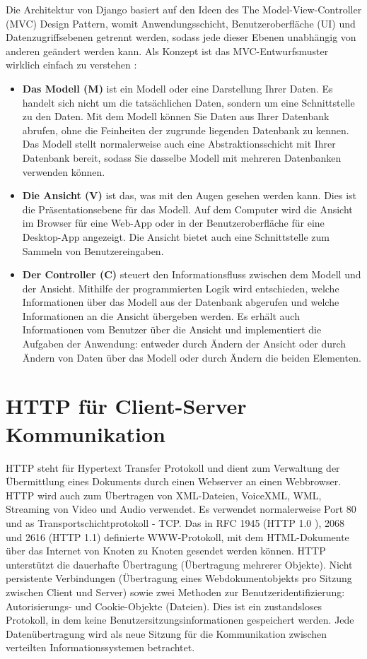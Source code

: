 Die Architektur von Django basiert auf den Ideen des The Model-View-Controller (MVC) Design Pattern, womit Anwendungsschicht, Benutzeroberfläche (UI) und Datenzugriffsebenen getrennt werden, sodass jede dieser Ebenen unabhängig von anderen geändert werden kann. Als Konzept ist das MVC-Entwurfsmuster wirklich einfach zu verstehen \cite[pp. 15-16]{george:django}:
\begin{itemize}
	\item \textbf{Das Modell (M)} ist ein Modell oder eine Darstellung Ihrer Daten. Es handelt sich nicht um die tatsächlichen Daten, sondern um eine Schnittstelle zu den Daten. Mit dem Modell können Sie Daten aus Ihrer Datenbank abrufen, ohne die Feinheiten der zugrunde liegenden Datenbank zu kennen. Das Modell stellt normalerweise auch eine Abstraktionsschicht mit Ihrer Datenbank bereit, sodass Sie dasselbe Modell mit mehreren Datenbanken verwenden können.
	\item \textbf{Die Ansicht (V)} ist das, was mit den Augen gesehen werden kann. Dies ist die Präsentationsebene für das Modell. Auf dem Computer wird die Ansicht im Browser für eine Web-App oder in der Benutzeroberfläche für eine Desktop-App angezeigt. Die Ansicht bietet auch eine Schnittstelle zum Sammeln von Benutzereingaben.
	\item \textbf{Der Controller (C)} steuert den Informationsfluss zwischen dem Modell und der Ansicht. Mithilfe der programmierten Logik wird entschieden, welche Informationen über das Modell aus der Datenbank abgerufen und welche Informationen an die Ansicht übergeben werden. Es erhält auch Informationen vom Benutzer über die Ansicht und implementiert die Aufgaben der Anwendung: entweder durch Ändern der Ansicht oder durch Ändern von Daten über das Modell oder durch Ändern die beiden Elementen.
\end{itemize}

\section{HTTP für Client-Server Kommunikation}
\label{sec:theorie:http}
HTTP steht für Hypertext Transfer Protokoll und dient zum Verwaltung der Übermittlung eines Dokuments durch einen Webserver an einen Webbrowser. HTTP wird auch zum Übertragen von XML-Dateien, VoiceXML, WML, Streaming von Video und Audio verwendet. Es verwendet normalerweise Port 80 und as Transportschichtprotokoll - TCP. Das in RFC 1945 (HTTP 1.0 \cite{website:httprfc1945}), 2068 \cite{website:httprfc2068} und 2616 (HTTP 1.1) definierte WWW-Protokoll, mit dem HTML-Dokumente über das Internet von Knoten zu Knoten gesendet werden können. HTTP unterstützt die dauerhafte Übertragung (Übertragung mehrerer Objekte). Nicht persistente Verbindungen (Übertragung eines Webdokumentobjekts pro Sitzung zwischen Client und Server) sowie zwei Methoden zur Benutzeridentifizierung: Autorisierungs- und Cookie-Objekte (Dateien). Dies ist ein zustandsloses Protokoll, in dem keine Benutzersitzungsinformationen gespeichert werden. Jede Datenübertragung wird als neue Sitzung für die Kommunikation zwischen verteilten Informationssystemen betrachtet. 

